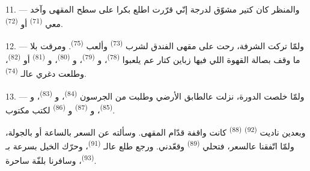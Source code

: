 \VUsaut{3.0mm}
\VUsaut{3.0mm}

11. --- والمنظر كان كتير مشوّق لدرجة إنّي قرّرت اطلع بكرا على سطح
المقهى وآخد معي  \textsuperscript{(71)} أو
 \textsuperscript{(72)}.

12. --- ولمّا تركت الشرفة، رحت على مقهى الفندق لشرب 
\textsuperscript{(73)} وألعب  \textsuperscript{(75)}.
ومرقت بلا ما وقف بصالة القهوة اللي فيها زباين كتار عم يلعبوا
 \textsuperscript{(78)}، و \textsuperscript{(79)}،
و \textsuperscript{(80)}، و
\textsuperscript{(81)} أو  \textsuperscript{(82)}، وطلعت
دغري عالـ \textsuperscript{(74)}.

13. --- ولمّا خلصت الدورة، نزلت عالطابق الأرضي وطلبت من الجرسون
 \textsuperscript{(84)}، و \textsuperscript{(83)}،
و \textsuperscript{(85)}، و
\textsuperscript{(87)} و \textsuperscript{(86)} لكتب مكتوب.

وبعدين ناديت  \textsuperscript{(92)} 
\textsuperscript{(88)} كانت واقفة قدّام المقهى. وسألته عن السعر بالساعة
أو بالجولة، ولمّا اتّفقنا عالسعر، فتحلي 
\textsuperscript{(89)} وقعّدني. ورجع طلع عالـ
\textsuperscript{(91)}، وحرّك الخيل بسرعة بـ
\textsuperscript{(93)}، وسافرنا بلفّة ساحرة.

\VUsaut{6.0mm}
\VUfilet{22mm}
